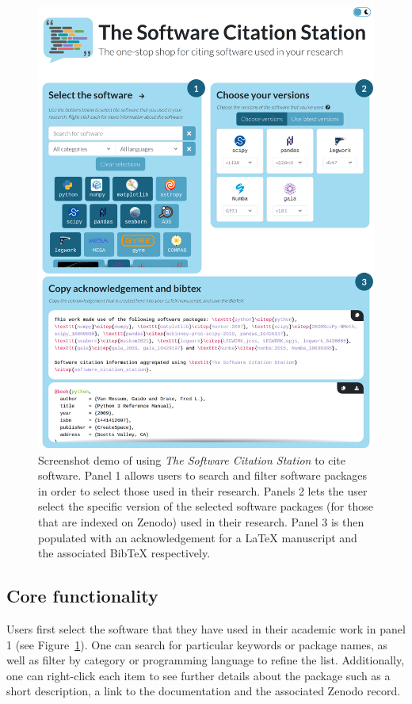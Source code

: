 \documentclass[twocolumn,linenumbers]{aastex631}
\newcommand{\site}{\textit{The Software Citation Station}\xspace}
\begin{document}
\begin{figure}
    \centering
    \includegraphics[width=\columnwidth]{figures/scs.png}
    \caption{Screenshot demo of using \site to cite software. Panel 1 allows users to search and filter software packages in order to select those used in their research. Panels 2 lets the user select the specific version of the selected software packages (for those that are indexed on Zenodo) used in their research. Panel 3 is then populated with an acknowledgement for a \LaTeX{} manuscript and the associated BibTeX respectively.}
    \label{fig:scs-screenshot}
\end{figure}


\subsection{Core functionality}

Users first select the software that they have used in their academic work in panel 1 (see Figure~\ref{fig:scs-screenshot}). One can search for particular keywords or package names, as well as filter by category or programming language to refine the list. Additionally, one can right-click each item to see further details about the package such as a short description, a link to the documentation and the associated Zenodo record.
\end{document}
